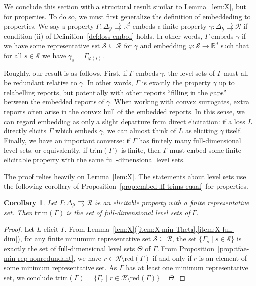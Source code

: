 \documentclass[11pt]{article}
\newcommand{\reals}{\mathbb{R}}
\newcommand{\simplex}{\Delta_\Y}
\newcommand{\R}{\mathcal{R}}
\newcommand{\Sc}{\mathcal{S}}
\newcommand{\Y}{\mathcal{Y}}
\newcommand{\toto}{\rightrightarrows}
\newcommand{\red}{\mathrm{red}}
\newcommand{\trimred}{\mathrm{trim}}
\newtheorem{corollary}{Corollary}
\begin{document}
We conclude this section with a structural result similar to Lemma~\ref{lem:X}, but for properties.
To do so, we must first generalize the definition of embeddeding to properties.
We say a property $\Gamma:\simplex\toto\reals^d$ embeds a finite property $\gamma:\simplex\toto\R$ if condition (ii) of Definition~\ref{def:loss-embed} holds.
In other words, $\Gamma$ embeds $\gamma$ if we have some representative set $\Sc\subseteq\R$ for $\gamma$ and embedding $\varphi:\Sc\to\reals^d$ such that for all $s\in\Sc$ we have $\gamma_s = \Gamma_{\varphi(s)}$.

Roughly, our result is as follows.
First, if $\Gamma$ embeds $\gamma$, the level sets of $\Gamma$ must all be redundant relative to $\gamma$.
In other words, $\Gamma$ is exactly the property $\gamma$ up to relabelling reports, but potentially with other reports ``filling in the gaps'' between the embedded reports of $\gamma$.
When working with convex surrogates, extra reports often arise in the convex hull of the embedded reports.
In this sense, we can regard embedding as only a slight departure from direct elicitation: if a loss $L$ directly elicits $\Gamma$ which embeds $\gamma$, we can almost think of $L$ as eliciting $\gamma$ itself.
Finally, we have an important converse: if $\Gamma$ has finitely many full-dimensional level sets, or equivalently, if $\trimred(\Gamma)$ is finite, then $\Gamma$ must embed some finite elicitable property with the same full-dimensional level sets.

The proof relies heavily on Lemma~\ref{lem:X}.
The statements about level sets use the following corollary of Proposition~\ref{prop:embed-iff-trims-equal} for properties.
\begin{corollary}\label{cor:trim-prop-red}
  Let $\Gamma : \simplex \toto \R$ be an elicitable property with a finite representative set.
  Then $\trimred(\Gamma)$ is the set of full-dimensional level sets of $\Gamma$.
\end{corollary}
\begin{proof}
  Let $L$ elicit $\Gamma$.
  From Lemma~\ref{lem:X}(\ref{item:X-min-Theta},\ref{item:X-full-dim}), for any finite minumum representative set $\Sc\subseteq\R$, the set $\{\Gamma_s\mid s\in\Sc\}$ is exactly the set of full-dimensional level sets $\Theta$ of $\Gamma$.
  From Proposition~\ref{prop:tfae-min-rep-nonredundant}, we have $r \in \R\setminus \red(\Gamma)$ if and only if $r$ is an element of some minimum representative set.
  As $\Gamma$ has at least one minimum representative set, we conclude $\trimred(\Gamma) = \{\Gamma_r \mid r\in \R\setminus\red(\Gamma)\} = \Theta$.  
\end{proof}
\end{document}
